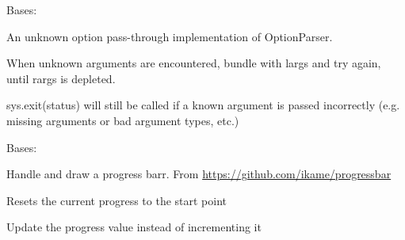 \documentclass[letterpaper,10pt,english]{sphinxmanual}
\begin{document}

\begin{fulllineitems}
\label{index:encore.utils.PassThroughOptionParser}
Bases: 

An unknown option pass-through implementation of OptionParser.

When unknown arguments are encountered, bundle with largs and try again,
until rargs is depleted.

sys.exit(status) will still be called if a known argument is passed
incorrectly (e.g. missing arguments or bad argument types, etc.)

\end{fulllineitems}


\begin{fulllineitems}
\label{index:encore.utils.ProgressBar}
Bases: 

Handle and draw a progress barr.  From \href{https://github.com/ikame/progressbar}{https://github.com/ikame/progressbar}

\begin{fulllineitems}
\label{index:encore.utils.ProgressBar.reset}
Resets the current progress to the start point

\end{fulllineitems}


\begin{fulllineitems}
\label{index:encore.utils.ProgressBar.update}
Update the progress value instead of incrementing it

\end{fulllineitems}


\end{fulllineitems}
\end{document}
